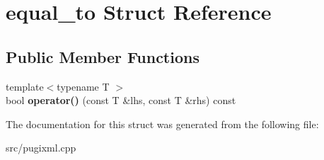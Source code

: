 \hypertarget{structequal__to}{}\section{equal\+\_\+to Struct Reference}
\label{structequal__to}
\subsection*{Public Member Functions}
\begin{DoxyCompactItemize}
\item 
\mbox{\label{structequal__to_a6cb8f069b02593f2e8bbe7f3960e47b9}} 
{\footnotesize template$<$typename T $>$ }\\bool {\bfseries operator()} (const T \&lhs, const T \&rhs) const
\end{DoxyCompactItemize}


The documentation for this struct was generated from the following file\+:\begin{DoxyCompactItemize}
\item 
src/pugixml.\+cpp\end{DoxyCompactItemize}
